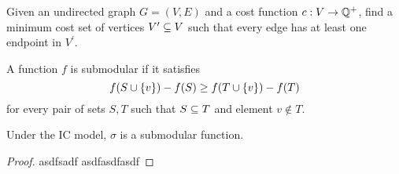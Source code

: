 \begin{problem}
    Given an undirected graph $G = (V, E)$ and a cost function $c: V \rightarrow \mathbb{Q}^+$, find a minimum cost 
    set of vertices $V^\prime \subseteq V$ such that every edge has at least one endpoint in $V^\prime$. 
    \label{prob:vertex_cover}
\end{problem}

\begin{definition}[Submodularity]
    A function $f$ is submodular if it satisfies
    \begin{equation*}
        f \! \left( S \cup \left\{ v \right\} \right) - f \! \left( S \right) \geq f \! \left( T \cup \left\{ v \right\} \right) - f \! \left( T \right)
    \end{equation*}
    for every pair of sets $S, T$ such that $S \subseteq T$ and element $v \notin T$.
    \label{def:submod} 
\end{definition}

\begin{theorem}
    Under the IC model, $\sigma$ is a submodular function. 
    \label{thm:}
\end{theorem}
\begin{proof}
    asdfsadf asdfasdfasdf 
\end{proof}
